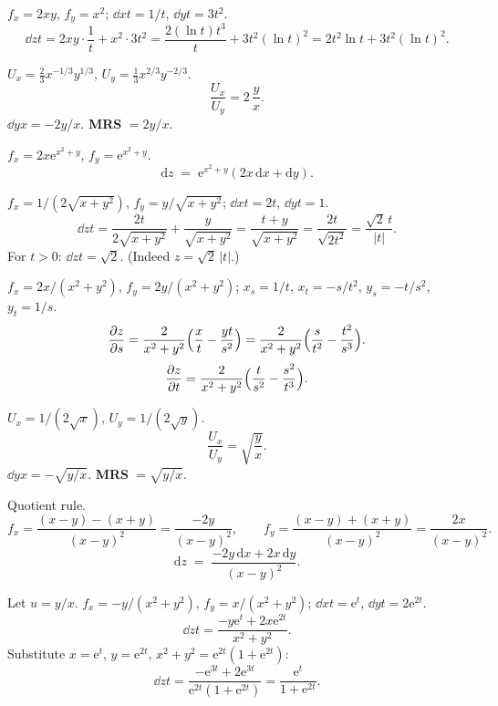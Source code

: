 \begin{solutions}
  \item $f_{x}=2xy$, $f_{y}=x^{2}$; $\dd{x}{t}=1/t$, $\dd{y}{t}=3t^{2}$.
        \[
          \dd{z}{t}=2xy\cdot\frac{1}{t}+x^{2}\cdot 3t^{2}
            =\frac{2(\ln t)t^{3}}{t}+3t^{2}(\ln t)^{2}
            =2t^{2}\ln t+3t^{2}(\ln t)^{2} .
        \]

  \item $U_{x}=\tfrac{2}{3}x^{-1/3}y^{1/3}$,
        $U_{y}=\tfrac{1}{3}x^{2/3}y^{-2/3}$.
        \[
          \frac{U_{x}}{U_{y}}=2\,\frac{y}{x} .
        \]
        $\dd{y}{x}=-2y/x$. \textbf{MRS} $=2y/x$.

  \item $f_{x}=2x\mathrm{e}^{x^{2}+y}$, $f_{y}=\mathrm{e}^{x^{2}+y}$.
        \[
          \mathrm{d}z \;=\; \mathrm{e}^{x^{2}+y}(2x\,\mathrm{d}x+\mathrm{d}y) .
        \]

  \item $f_{x}=1/(2\sqrt{x+y^{2}})$, $f_{y}=y/\sqrt{x+y^{2}}$;
        $\dd{x}{t}=2t$, $\dd{y}{t}=1$.
        \[
          \dd{z}{t}=\frac{2t}{2\sqrt{x+y^{2}}}+\frac{y}{\sqrt{x+y^{2}}}
            =\frac{t+y}{\sqrt{x+y^{2}}}=\frac{2t}{\sqrt{2t^{2}}}
            =\frac{\sqrt{2}\,t}{|t|} .
        \]
        For $t>0$: $\dd{z}{t}=\sqrt{2}$. (Indeed $z=\sqrt{2}\,|t|$.)

  \item $f_{x}=2x/(x^{2}+y^{2})$, $f_{y}=2y/(x^{2}+y^{2})$;
        $x_{s}=1/t$, $x_{t}=-s/t^{2}$, $y_{s}=-t/s^{2}$, $y_{t}=1/s$.
        \[
          \frac{\partial z}{\partial s}=\frac{2}{x^{2}+y^{2}}\Bigl(\frac{x}{t}-\frac{yt}{s^{2}}\Bigr)
            =\frac{2}{x^{2}+y^{2}}\Bigl(\frac{s}{t^{2}}-\frac{t^{2}}{s^{3}}\Bigr) .
        \]
        \[
          \frac{\partial z}{\partial t}=\frac{2}{x^{2}+y^{2}}\Bigl(\frac{t}{s^{2}}-\frac{s^{2}}{t^{3}}\Bigr) .
        \]

  \item $U_{x}=1/(2\sqrt{x})$, $U_{y}=1/(2\sqrt{y})$.
        \[
          \frac{U_{x}}{U_{y}}=\sqrt{\frac{y}{x}} .
        \]
        $\dd{y}{x}=-\sqrt{y/x}$. \textbf{MRS} $=\sqrt{y/x}$.

  \item Quotient rule.
        \[
          f_{x}=\frac{(x-y)-(x+y)}{(x-y)^{2}}=\frac{-2y}{(x-y)^{2}},\qquad
          f_{y}=\frac{(x-y)+(x+y)}{(x-y)^{2}}=\frac{2x}{(x-y)^{2}} .
        \]
        \[
          \mathrm{d}z \;=\; \frac{-2y\,\mathrm{d}x+2x\,\mathrm{d}y}{(x-y)^{2}} .
        \]

  \item Let $u=y/x$. $f_{x}=-y/(x^{2}+y^{2})$, $f_{y}=x/(x^{2}+y^{2})$;
        $\dd{x}{t}=\mathrm{e}^{t}$, $\dd{y}{t}=2\mathrm{e}^{2t}$.
        \[
          \dd{z}{t}=\frac{-y\mathrm{e}^{t}+2x\mathrm{e}^{2t}}{x^{2}+y^{2}} .
        \]
        Substitute $x=\mathrm{e}^{t}$, $y=\mathrm{e}^{2t}$,
        $x^{2}+y^{2}=\mathrm{e}^{2t}(1+\mathrm{e}^{2t})$:
        \[
          \dd{z}{t}=\frac{-\mathrm{e}^{3t}+2\mathrm{e}^{3t}}
            {\mathrm{e}^{2t}(1+\mathrm{e}^{2t})}
            =\frac{\mathrm{e}^{t}}{1+\mathrm{e}^{2t}} .
        \]


\end{solutions}
